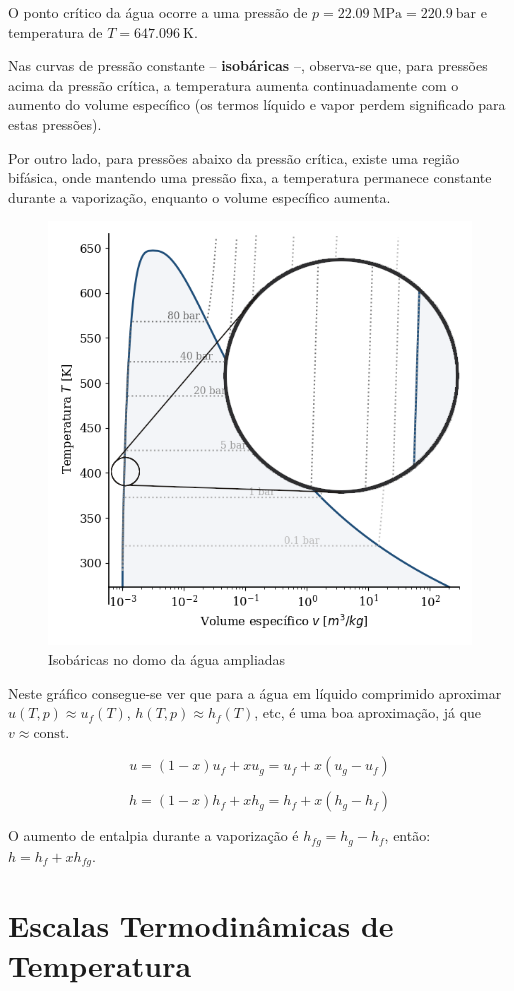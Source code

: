 O ponto crítico da água ocorre a uma pressão de $p = 22.09~\text{MPa} = 220.9~\text{bar}$ e temperatura de $T = 647.096~\text{K}$.

Nas curvas de pressão constante -- \textbf{isobáricas} --, observa-se que, para pressões acima da pressão crítica, a temperatura aumenta continuadamente com o aumento do volume específico (os termos líquido e vapor perdem significado para estas pressões). 

Por outro lado, para pressões abaixo da pressão crítica, existe uma região bifásica, onde mantendo uma pressão fixa, a temperatura permanece constante durante a vaporização, enquanto o volume específico aumenta.

\begin{figure}[H]
    \centering
    \includegraphics[width=0.4\linewidth]{graphs/water-dome-Tv-circle.png}
    \caption{Isobáricas no domo da água ampliadas}
    \label{fig:water-dome-Tv-amp}
\end{figure}

Neste gráfico consegue-se ver que para a água em líquido comprimido aproximar $u(T, p) \approx u_f(T)$, $h(T, p) \approx h_f(T)$, etc, é uma boa aproximação, já que $v \approx \text{const}$.

\begin{equation}
    u = (1-x) u_f + x u_g = u_f + x(u_g - u_f)
\end{equation}

\begin{equation}
    h = (1-x) h_f + x h_g = h_f + x(h_g - h_f)
\end{equation}

O aumento de entalpia durante a vaporização é $h_{fg} = h_g - h_f$, então: $h = h_f + x h_{fg}$.

\section{Escalas Termodinâmicas de Temperatura}

